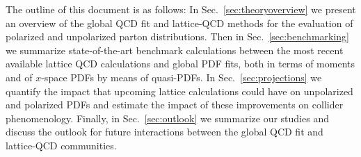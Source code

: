 The outline of this document is as follows:
%
In Sec.~\ref{sec:theoryoverview} we present an overview of
the global QCD fit and lattice-QCD methods for the evaluation
of polarized and unpolarized parton distributions.
%
Then in Sec.~\ref{sec:benchmarking}
we summarize state-of-the-art benchmark
calculations between the most
recent available lattice QCD calculations and global PDF fits,
both in terms of moments and of $x$-space PDFs by means of
quasi-PDFs.
%
In Sec.~\ref{sec:projections} we quantify the impact that
upcoming lattice calculations could have on unpolarized
and polarized PDFs and estimate the impact of these improvements
on collider phenomenology.
%
Finally, in Sec.~\ref{sec:outlook} we summarize our studies
and discuss the outlook for future interactions between
the global QCD fit and lattice-QCD communities.
